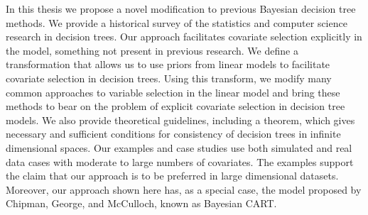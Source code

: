 \documentclass[12pt]{report}
\def\listofsymbols{ \clearpage}
\def\listofabbreviations{ \clearpage}
\begin{document}
In this thesis we propose a novel modification to previous Bayesian decision tree methods. We provide a historical survey of the statistics and computer science research in decision trees. Our approach facilitates covariate selection explicitly in the model, something not present in previous research. We define a transformation that allows us to use priors from linear models to facilitate covariate selection in decision trees. Using this transform, we modify many common approaches to variable selection in the linear model and bring these methods to bear on the problem of explicit covariate selection in decision tree models. We also provide theoretical guidelines, including a theorem, which gives necessary and sufficient conditions for consistency of decision trees in infinite dimensional spaces. Our examples and case studies use both simulated and real data cases with moderate to large numbers of covariates. The examples support the claim that our approach is to be preferred in large dimensional datasets. Moreover, our approach shown here has, as a special case, the model proposed by Chipman, George, and McCulloch, known as Bayesian CART.    



\pagebreak
\tableofcontents
\pagebreak

\listoffigures
\pagebreak

\listoftables
\pagebreak

\clearpage
{}
\listofsymbols
\pagebreak

\clearpage
\listofabbreviations
\pagebreak

\cleardoublepage
{}
\end{document}
